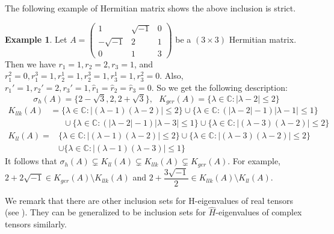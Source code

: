 \documentclass[10pt,reqno]{amsart}
\theoremstyle{definition}
\newtheorem{exam}[thm]{Example}
\begin{document}
The following example of Hermitian matrix shows the above inclusion is strict.
\begin{exam}
Let $A=\begin{pmatrix} 1&\sqrt{-1}&0\\-\sqrt{-1}&2&1\\0&1&3\end{pmatrix}$ be a $(3\times 3)$ Hermitian matrix. Then we have $r_1=1, r_2=2, r_3=1$, and $r^2_1=0, r^3_1=1, r_2^1=1, r_2^3=1,r_3^1=1, r_3^2=0$. Also, $r_1'=1, r_2'=2, r_3'=1, \hat{r}_1=\hat{r}_2=\hat{r}_3=0$.
So we get the following description:
$$ \sigma_h(A)=\{2-\sqrt{3},2,2+\sqrt{3}\}, \ \ \  K_{ger}(A)=\{\lambda\in \mathbb C: |\lambda-2|\leq 2\}$$
 \begin{align*} K_{llk}(A)&=\{\lambda\in \mathbb C:|(\lambda-1)(\lambda-2)|\leq 2\}\cup \{\lambda\in \mathbb C:(|\lambda-2|-1)|\lambda-1|\leq 1\}\\
& \ \ \ \ \ \ \  \cup \{\lambda\in \mathbb C:(|\lambda-2|-1)|\lambda-3|\leq 1\} \cup \{\lambda\in \mathbb C:|(\lambda-3)(\lambda-2)|\leq 2\} \end{align*}
\begin{align*} K_{ll}(A)=&\{\lambda\in \mathbb C:|(\lambda-1)(\lambda-2)|\leq 2\}\cup \{\lambda\in \mathbb C:|(\lambda-3)(\lambda-2)|\leq 2\}\\
&\cup\{\lambda\in \mathbb C:|(\lambda-1)(\lambda-3)|\leq 1\}
\end{align*}
It follows that $\sigma_h(A)\subsetneq K_{ll}(A)\subsetneq K_{llk}(A)\subsetneq K_{ger}(A)$. For example, $2+2\sqrt{-1}\in  K_{ger}(A)\setminus K_{llk}(A)$ and $2+
\dfrac{3\sqrt{-1}}{2}\in K_{llk}(A)\setminus K_{ll}(A)$.
\end{exam}
We remark that there are other inclusion sets for H-eigenvalues of real tensors (see \cite{BWL}\cite{LCL}\cite{LJL}\cite{LZL}\cite{WZC}). They can be generalized to be inclusion sets for $\hat{H}$-eigenvalues of complex tensors similarly.
\end{document}
